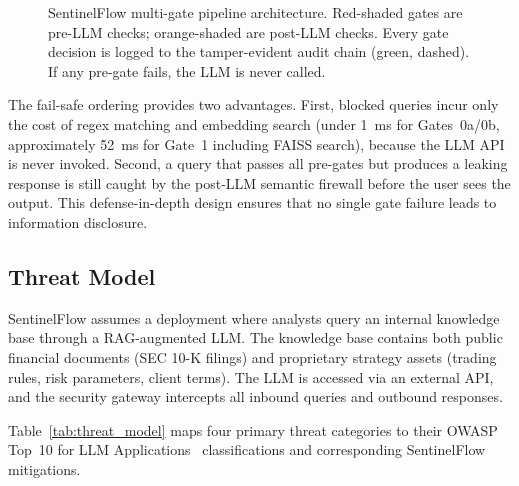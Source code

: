 \documentclass[journal,12pt,onecolumn,draftclsnofoot]{IEEEtran}
\begin{document}
\begin{figure}[!ht]
\caption{SentinelFlow multi-gate pipeline architecture. Red-shaded gates are pre-LLM checks; orange-shaded are post-LLM checks. Every gate decision is logged to the tamper-evident audit chain (green, dashed). If any pre-gate fails, the LLM is never called.}
\label{fig:architecture}
\end{figure}

The fail-safe ordering provides two advantages. First, blocked queries incur only the cost of regex matching and embedding search (under 1~ms for Gates~0a/0b, approximately 52~ms for Gate~1 including FAISS search), because the LLM API is never invoked. Second, a query that passes all pre-gates but produces a leaking response is still caught by the post-LLM semantic firewall before the user sees the output. This defense-in-depth design ensures that no single gate failure leads to information disclosure.

\subsection{Threat Model}
\label{Sect:Threat_Model}

SentinelFlow assumes a deployment where analysts query an internal knowledge base through a RAG-augmented LLM. The knowledge base contains both public financial documents (SEC 10-K filings) and proprietary strategy assets (trading rules, risk parameters, client terms). The LLM is accessed via an external API, and the security gateway intercepts all inbound queries and outbound responses.

Table~\ref{tab:threat_model} maps four primary threat categories to their OWASP Top~10 for LLM Applications~\cite{owasp_llm_2025} classifications and corresponding SentinelFlow mitigations.
\end{document}
